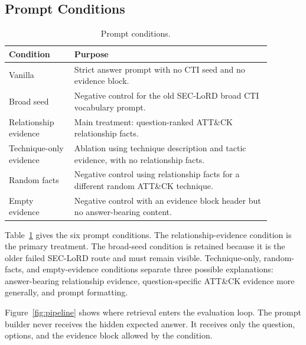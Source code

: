 \documentclass[10pt]{article}
\begin{document}
\subsection{Prompt Conditions}

\begin{table}[H]
  \centering
  \caption{Prompt conditions.}
  \label{tab:conditions}
  \begin{tabular}{p{0.22\linewidth}p{0.66\linewidth}}
    \toprule
    Condition & Purpose \\
    \midrule
    Vanilla & Strict answer prompt with no CTI seed and no evidence block. \\
    Broad seed & Negative control for the old SEC-LoRD broad CTI vocabulary prompt. \\
    Relationship evidence & Main treatment: question-ranked ATT\&CK relationship facts. \\
    Technique-only evidence & Ablation using technique description and tactic evidence, with no relationship facts. \\
    Random facts & Negative control using relationship facts for a different random ATT\&CK technique. \\
    Empty evidence & Negative control with an evidence block header but no answer-bearing content. \\
    \bottomrule
  \end{tabular}
\end{table}

Table~\ref{tab:conditions} gives the six prompt conditions.
The relationship-evidence condition is the primary treatment.
The broad-seed condition is retained because it is the older failed SEC-LoRD route and must remain visible.
Technique-only, random-facts, and empty-evidence conditions separate three possible explanations: answer-bearing relationship evidence, question-specific ATT\&CK evidence more generally, and prompt formatting.

Figure~\ref{fig:pipeline} shows where retrieval enters the evaluation loop.
The prompt builder never receives the hidden expected answer.
It receives only the question, options, and the evidence block allowed by the condition.
\end{document}
